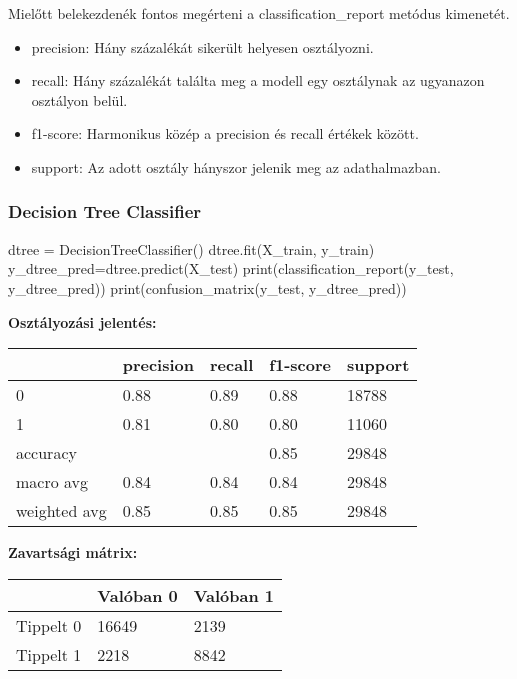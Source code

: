 Mielőtt belekezdenék fontos megérteni a classification\_report metódus kimenetét.
\begin{itemize}
    \item precision: Hány százalékát sikerült helyesen osztályozni.
    \item recall: Hány százalékát találta meg a modell egy osztálynak az ugyanazon osztályon belül.
    \item f1-score: Harmonikus közép a precision és recall értékek között.
    \item support: Az adott osztály hányszor jelenik meg az adathalmazban.
\end{itemize}

\subsubsection{Decision Tree Classifier}
\begin{python}
dtree = DecisionTreeClassifier()
dtree.fit(X_train, y_train)
y_dtree_pred=dtree.predict(X_test)
print(classification_report(y_test, y_dtree_pred))
print(confusion_matrix(y_test, y_dtree_pred))
\end{python}

\medskip

\noindent \textbf{Osztályozási jelentés:}

\medskip

\begin{tabular}{|l|l|l|l|l|}
            \hline
             & precision & recall & f1-score & support \\
             \hline
0            & 0.88      & 0.89   & 0.88     & 18788   \\
            \hline
1            & 0.81      & 0.80   & 0.80     & 11060   \\
            \hline
accuracy     &           &        & 0.85     & 29848   \\
            \hline
macro avg    & 0.84      & 0.84   & 0.84     & 29848   \\
            \hline
weighted avg & 0.85      & 0.85   & 0.85     & 29848   \\
            \hline
\end{tabular}

\medskip

\noindent \textbf{Zavartsági mátrix:}

\medskip

\begin{tabular}{|l|l|l|}
\hline
          & Valóban 0 & Valóban 1 \\
\hline
Tippelt 0 & 16649     & 2139      \\
\hline
Tippelt 1 & 2218      & 8842   \\
\hline
\end{tabular}

